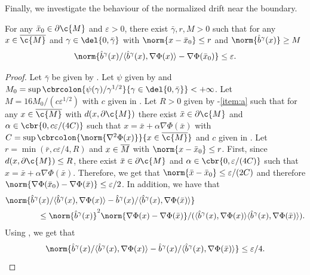 Finally, we investigate the behaviour of the normalized drift near the boundary.

\begin{proposition}
	\label{prop:condition_duo_iv}
	For any $\bar{x}_0 \in \partial \c{M}$ and $\varepsilon >0$, there exist $\bar{\gamma}, r, M >0$ such that for any $x \in \cl{\c{M}}$ and $\gamma \in \del{0, \bar{\gamma}}$ with $\norm{x - \bar{x}_0} \leq r$ and $\norm{\hat{b}^\gamma(x)} \geq M$ \begin{equation} \norm{\hat{b}^\gamma(x)/\langle \hat{b}^\gamma(x), \nabla \Phi(x) \rangle - \nabla \Phi(\bar{x}_0)} \leq \varepsilon .
	\end{equation}
\end{proposition}

\begin{proof}
	Let $\bar{\gamma}$ be given by .
	Let $\psi$ given by  and $M_0 = \sup \cbrcolon{\psi(\gamma)/\gamma^{1/2}}{\gamma \in \del{0, \bar{\gamma}}} < +\infty$.
	Let $M = 16 M_0 / (c\varepsilon^{1/2})$ with $c$ given in .
	Let $R > 0$ given by -\ref{item:a} such that for any $x \in \cl{\c{M}}$ with $d(x, \partial \c{M})$ there exist $\bar{x} \in \partial \c{M}$ and $\alpha \in \cbr{0, c \varepsilon /(4C)}$ such that $x = \bar{x} + \alpha \nabla \Phi(\bar{x})$ with $C = \sup \cbrcolon{\norm{\nabla^2 \Phi(x)}}{x \in \cl{\c{M}}}$ and $c$ given in .
	Let $r = \min(\bar{r}, c \varepsilon/4, R)$ and $x \in \overline{M}$ with $\norm{x - \bar{x}_0} \leq r$.
	First, since $d(x, \partial \c{M}) \leq R$, there exist $\bar{x} \in \partial \c{M}$ and $\alpha \in \cbr{0,\varepsilon/(4C)}$ such that $x = \bar{x} + \alpha \nabla \Phi(\bar{x})$.
	Therefore, we get that $\norm{\bar{x} - \bar{x}_0} \leq \varepsilon/(2C)$ and therefore $\norm{\nabla \Phi(\bar{x}_0) - \nabla \Phi(\bar{x})} \leq \varepsilon /2$.
	In addition, we have that \begin{align}  & \norm{\hat{b}^\gamma(x)/\langle \hat{b}^\gamma(x), \nabla \Phi(x) \rangle - \hat{b}^\gamma(x)/\langle \hat{b}^\gamma(x), \nabla \Phi(\bar{x}) \rangle} \\ & \qquad \qquad \leq \norm{\hat{b}^\gamma(x)}^2 \norm{\nabla \Phi(x) - \nabla \Phi(\bar{x})} / (\langle \hat{b}^\gamma(x), \nabla \Phi(x) \rangle \langle \hat{b}^\gamma(x), \nabla \Phi(\bar{x}) \rangle) .
	\end{align}
	Using , we get that \begin{equation} \norm{\hat{b}^\gamma(x)/\langle \hat{b}^\gamma(x), \nabla \Phi(x) \rangle - \hat{b}^\gamma(x)/\langle \hat{b}^\gamma(x), \nabla \Phi(\bar{x}) \rangle} \leq \varepsilon/4 .

\end{equation}
\end{proof}
